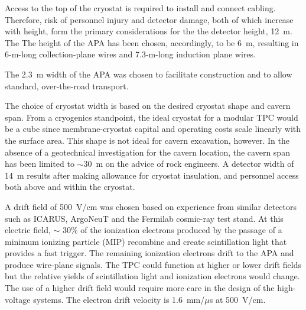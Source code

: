   Access to the top of the cryostat is required to install and connect cabling. Therefore, risk of personnel injury and detector damage, both of which increase with height, form the primary considerations for the the detector height, 12~m. The  The height of the APA has been chosen, accordingly, to be 6~m, resulting in 6-m-long collection-plane wires and 7.3-m-long induction plane wires. 

The 2.3~m width of the APA was chosen to facilitate construction and to allow standard, over-the-road transport. 

The choice of cryostat width is based on the desired cryostat shape and cavern span. From a cryogenics standpoint, the ideal cryostat for a modular TPC would be a cube since membrane-cryostat capital and operating costs scale linearly with the surface area. This shape is not ideal for cavern excavation, however. In the absence of a geotechnical investigation for the cavern location, the cavern span has been limited to $\sim$30~m on the advice of rock engineers. A detector width of 14~m results after making allowance for cryostat insulation, and personnel access both above and within the cryostat. 

A drift field of 500~V/cm was chosen based on experience from similar detectors such as ICARUS, ArgoNeuT and the Fermilab cosmic-ray test stand. At this electric field, $\sim$ 30\% of the ionization electrons produced by the passage of a minimum ionizing particle (MIP) recombine and create scintillation light that provides a fast trigger. The remaining ionization electrons drift to the APA and produce wire-plane signals. The TPC could function at higher or lower drift fields but the relative yields of scintillation light and ionization electrons would change. The use of a higher drift field would require more care in the design of the high-voltage systems. The electron drift velocity is 1.6~mm/$\mu$s at 500~V/cm.

